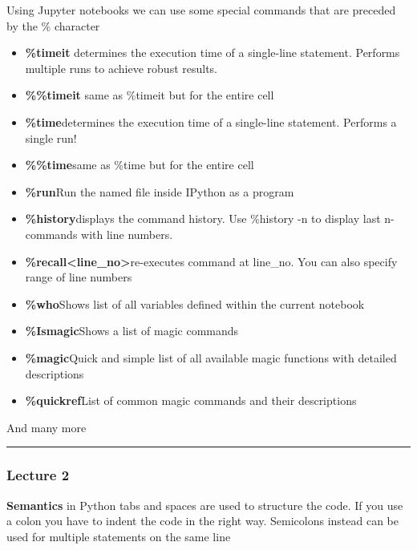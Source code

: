 Using Jupyter notebooks we can use some special commands that are preceded by the \% character
\begin{itemize}
    \item \textbf{\%timeit} \ra determines the execution time of a single-line
statement. Performs multiple runs to achieve robust results.
    \item \textbf{\%\%timeit} \ra same as \%timeit but for the entire cell
    \item \textbf{\%time}\ra determines the execution time of a single-line
statement. Performs a single run!
    \item \textbf{\%\%time}\ra same as \%time but for the entire cell
    \item \textbf{\%run}\ra Run the named file inside IPython as a program
    \item \textbf{\%history}\ra displays the command history. Use \%history -n to display last n-commands with line
numbers.
    \item \textbf{\%recall<line\_no>}\ra  re-executes command at line\_no. You can also specify range of line numbers
    \item \textbf{\%who}\ra Shows list of all variables defined within the current notebook
    \item \textbf{\%Ismagic}\ra Shows a list of magic commands
    \item \textbf{\%magic}\ra Quick and simple list of all available magic functions with detailed descriptions
    \item \textbf{\%quickref}\ra List of common magic commands and their descriptions
\end{itemize}

And many more

\vspace{10pt}

\hrule

\subsubsection{Lecture 2}

\vspace{10pt}

\textbf{Semantics} \ra in Python tabs and spaces are used to structure the code. If you use a colon you have to indent the code in the right way. Semicolons instead can be used for multiple statements on the same line

\vspace{10pt}

